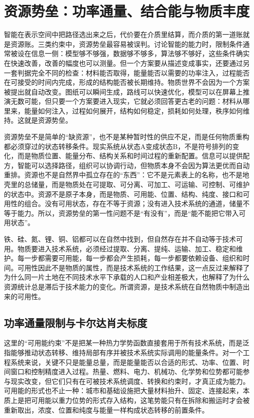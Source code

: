\section{资源势垒：功率通量、结合能与物质丰度}

智能在表示空间中把路径选出来之后，代价要在介质里结算，而介质的第一道账就是资源账。三类约束中，资源势垒最容易被误判。讨论智能的能力时，限制条件通常被设在信息一侧：模型够不够强，数据够不够多，算法够不够好，这些条件确实在快速改善，改善的幅度也可以测量。但一个方案要从描述变成事实，还要通过另一套判据完全不同的检查：材料能否取得，能量能否以需要的功率注入，过程能否在可接受的时间内完成，形成的结构能否被长期维持。物质世界不会因为一个方案被提出就自动改变。图纸可以瞬间生成，路线可以快速优化，模型可以在屏幕上推演无数可能，但只要一个方案要进入现实，它就必须回答更古老的问题：材料从哪里来，能量如何注入，过程如何展开，结构如何稳定，损耗如何处理，秩序如何维持。这就是资源势垒。

资源势垒不是简单的“缺资源”，也不是某种暂时性的供应不足，而是任何物质重构都必须穿过的状态转移条件。现实系统从状态A变成状态B，不是符号排列的变化，而是物质位置、能量分布、结构关系和时间过程的重新配置。信息可以提供配方，智能可以选择路径，组织可以协调行动，但物质本身不会因为算法更优而自动重排。资源也不是自然界中孤立存在的“东西”：它不是元素表上的名称，也不是地壳里的总储量，而是物质处在可提取、可分离、可加工、可运输、可控制、可维护的状态中。资源不是原子本身，而是物质、可用能、位置、结构、纯度、接口和可用性的组合。没有可用状态，存在不等于资源；没有进入技术系统的通道，储量不等于能力。所以，资源势垒的第一性问题不是“有没有”，而是“能不能把它带入可用状态”。

铁、硅、氮、锂、铜、铝都可以在自然中找到，但自然存在并不自动等于技术可用。物质要进入技术系统，必须经过提取、分离、提纯、运输、加工、稳定和维护。每一步都需要可用能，每一步都会产生损耗，每一步都要依赖设备、组织和时间。可用性因此不是物质的属性，而是技术系统的工作结果，这一点反过来解释了为什么同一片土地在不同技术水平下承载的人口和产业相差极大，也解释了为什么资源统计总是滞后于技术能力的变化。所谓资源，是技术系统在自然物质中制造出来的可用性。

\subsection{功率通量限制与卡尔达肖夫标度}


这里的“可用能约束”不是把某一种热力学势函数直接套用于所有技术系统，而是泛指能够推动状态转移、维持局部有序并被技术系统实际调用的能量条件。对一个工程系统来说，关键不只是能量总量，而是能量能否以合适的形式、功率、位置、时间窗口和控制精度进入过程。热量、燃料、电力、机械功、化学势和位势都可能参与现实改变，但它们只有在可被技术系统调度、转换和约束时，才真正成为能力。可用能的形式也不止一种：城市和基础设施把大量材料抬升、固定、连接起来，本质上是把可用能以重力位势的形式存入结构，这笔势能只有在拆除和搬运时才会被重新取出，浓度、位置和纯度与能量一样构成状态转移的前置条件。

